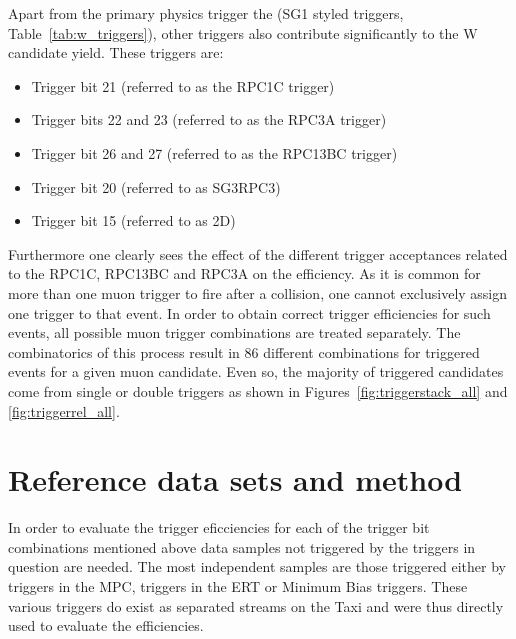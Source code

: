 Apart from the primary physics trigger the (SG1 styled triggers,
Table~\ref{tab:w_triggers}), other triggers also contribute significantly to the
W candidate yield. These triggers are:

\begin{itemize}
  \item Trigger bit 21 (referred to as the RPC1C trigger)
  \item Trigger bits 22 and 23 (referred to as the RPC3A trigger)
  \item Trigger bit 26 and 27 (referred to as the RPC13BC trigger)
  \item Trigger bit 20 (referred to as SG3RPC3)
  \item Trigger bit 15 (referred to as 2D)
\end{itemize}

{\noindent} Furthermore one clearly sees the effect of the different trigger
acceptances related to the RPC1C, RPC13BC and RPC3A on the efficiency. As it is
common for more than one muon trigger to fire after a collision, one cannot
exclusively assign one trigger to that event. In order to obtain correct trigger
efficiencies for such events, all possible muon trigger combinations are treated
separately.  The combinatorics of this process result in 86 different
combinations for triggered events for a given muon candidate. Even so, the
majority of triggered candidates come from single or double triggers as shown in
Figures~\ref{fig:triggerstack_all} and \ref{fig:triggerrel_all}.

\section{Reference data sets and method}
In order to evaluate the trigger eficciencies for each of the trigger bit
combinations mentioned above data samples not triggered by the triggers in
question are needed. The most independent samples are those triggered either by
triggers in the MPC, triggers in the ERT or Minimum Bias triggers. These various
triggers do exist as separated streams on the Taxi and were thus directly used
to evaluate the efficiencies. 

